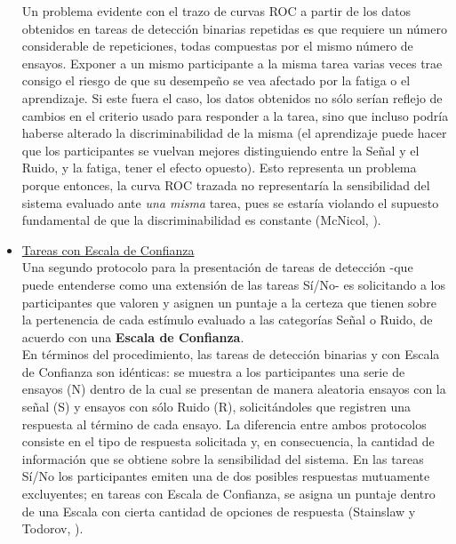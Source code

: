 \begin{itemize}
Un problema evidente con el trazo de curvas ROC a partir de los datos obtenidos en tareas de detección binarias repetidas es que requiere un número considerable de repeticiones, todas compuestas por el mismo número de ensayos. Exponer a un mismo participante a la misma tarea varias veces trae consigo el riesgo de que su desempeño se vea afectado por la fatiga o el aprendizaje. Si este fuera el caso, los datos obtenidos no sólo serían reflejo de cambios en el criterio usado para responder a la tarea, sino que incluso podría haberse alterado la discriminabilidad de la misma (el aprendizaje puede hacer que los participantes se vuelvan mejores distinguiendo entre la Señal y el Ruido, y la fatiga, tener el efecto opuesto). Esto representa un problema porque entonces, la curva ROC trazada no representaría la sensibilidad del sistema evaluado ante \textit{una misma} tarea, pues se estaría violando el supuesto fundamental de que la discriminabilidad es constante (McNicol, \citeyear{McNicol2}).\\

\item \underline{Tareas con Escala de Confianza}\\

Una segundo protocolo para la presentación de tareas de detección -que puede entenderse como una extensión de las tareas Sí/No- es solicitando a los participantes que valoren y asignen un puntaje a la certeza que tienen sobre la pertenencia de cada estímulo evaluado a las categorías Señal o Ruido, de acuerdo con una \textbf{Escala de Confianza}.\\

En términos del procedimiento, las tareas de detección binarias y con Escala de Confianza son idénticas: se muestra a los participantes una serie de ensayos (N) dentro de la cual se presentan de manera aleatoria ensayos con la señal (S) y ensayos con sólo Ruido (R), solicitándoles que registren una respuesta al término de cada ensayo. La diferencia entre ambos protocolos consiste en el tipo de respuesta solicitada y, en consecuencia, la cantidad de información que se obtiene sobre la sensibilidad del sistema. En las tareas Sí/No los participantes emiten una de dos posibles respuestas mutuamente excluyentes; en tareas con Escala de Confianza, se asigna un puntaje dentro de una Escala con cierta cantidad de opciones de respuesta (Stainslaw y Todorov, \citeyear{Stainslaw1999}).\\


\end{itemize}

